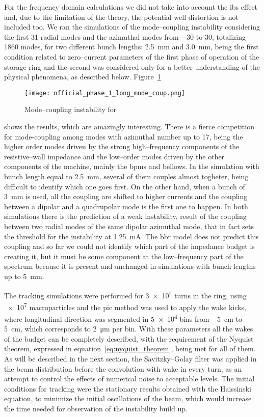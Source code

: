     For the frequency domain calculations we did not take into account the \gls{ibs} effect and, due to the limitation of the theory, the potential well distortion is not included too. We ran the simulations of the mode--coupling instability considering the first \num{31} radial modes and the azimuthal modes from \num{-30} to \num{30}, totalizing \num{1860} modes, for two different bunch lengths: \SI{2.5}{\milli\meter} and \SI{3.0}{\milli\meter}, being the first condition related to zero--current parameters of the first phase of operation of the storage ring and the second was considered only for a better understanding of the physical phenomena, as described below.
    Figure~\ref{fig:ph1_long_mode_coup}
    \begin{figure}
        \centering
        \texttt{[image: official\_phase\_1\_long\_mode\_coup.png]}
        \caption{Mode--coupling instability for }
        \label{fig:ph1_long_mode_coup}
    \end{figure}
    shows the results, which are amazingly interesting. There is a fierce competition for mode-coupling among modes with azimuthal number up to \num{17}, being the higher order modes driven by the strong high--frequency components of the resistive--wall impedance and the low--order modes driven by the other components of the machine, mainly the \glspl{bpm} and bellows. In the simulation with bunch length equal to \SI{2.5}{\milli\meter}, several of them couples almost togheter, being difficult to identify which one goes first. On the other hand, when a bunch of \SI{3}{\milli\meter} is used, all the coupling are shifted to higher currents and the coupling between a dipolar and a quadrupolar mode is the first one to happen. In both simulations there is the prediction of a weak instability, result of the coupling between two radial modes of the same dipolar azimuthal mode, that in fact sets the threshold for the instability at \SI{1.25}{\milli\ampere}. The \gls{bbr} model does not predict this coupling and so far we could not identify which part of the impedance budget is creating it, but it must be some component at the low--frequency part of the spectrum because it is present and unchanged in simulations with bunch lengths up to \SI{5}{\milli\meter}.

    The tracking simulations were performed for \num{3e4} turns in the ring, using \num{e7} macroparticles and the \gls{pic} method was used to apply the wake kicks, where longitudinal direction was segmented in \num{5e4} bins from \SI{-5}{\centi\meter} to \SI{5}{\centi\meter}, which corresponds to \SI{2}{\micro\meter} per bin. With these parameters all the wakes of the budget can be completely described, with the requirement of the Nyquist theorem, expressed in equation~\eqref{eq:nyquist_theorem}, being met for all of them. As will be described in the next section, the Savitzky--Golay filter was applied in the beam distribution before the convolution with wake in every turn, as an attempt to control the effects of numerical noise to acceptable levels. The initial conditions for tracking were the stationary results obtained with the Haissinski equation, to minimize the initial oscillations of the beam, which would increase the time needed for observation of the instability build up.

